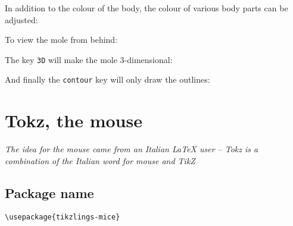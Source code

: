 \documentclass[parskip=half]{scrartcl}
\newcommand{\TikZ}{Ti\emph{k}Z\xspace}
\begin{document}
In addition to the colour of the body, the colour of various body parts can be adjusted:
\begin{tcblisting}{}
\moles[eye=red]
\end{tcblisting}

\begin{tcblisting}{}
\moles[muzzle=red]
\end{tcblisting}

\begin{tcblisting}{}
\moles[hands=red]
\end{tcblisting}

\begin{tcblisting}{}
\moles[feet=red]
\end{tcblisting}

\begin{tcblisting}{}
\moles[mouth=red]
\end{tcblisting}

To view the mole from behind:
\begin{tcblisting}{}
\moles[back]
\end{tcblisting}

The key \lstinline|3D| will make the mole 3-dimensional:
\begin{tcblisting}{}
\moles[3D]
\end{tcblisting}

And finally the \lstinline|contour| key will only draw the outlines:
\begin{tcblisting}{}
\moles[contour=black]
\end{tcblisting}

%
%
\clearpage
\section[Mouse]{Tokz, the mouse}

\emph{The idea for the mouse came from an Italian \LaTeX{} user -- Tokz is a combination of the Italian word for mouse and \TikZ}

\subsection{Package name}

\begin{tcolorbox}[lower separated=false, lefthand width=.8\linewidth]
\vspace*{0.5cm}
\lstinline|\usepackage{tikzlings-mice}| 
\vspace*{0.5cm}
\end{tcolorbox}
\end{document}
